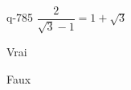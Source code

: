 \begin{truefalse}{q-785}
$\dfrac{2}{\sqrt{3}-1}=1+\sqrt{3}$
\item* Vrai
\item Faux
\end{truefalse}

